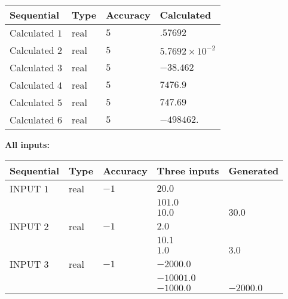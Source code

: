 \documentclass[12pt]{article}
\begin{document}
  
\noindent\begin{tabular}{|l|l|l|l|}
\hline
 Sequential & Type & Accuracy & Calculated \\ 
\hline
 
 
  Calculated $           1$ & real & $           5 $ & 
 $ .57692 $ 
 \\  \hline  
 
 
  Calculated $           2$ & real & $           5 $ & 
 $ 5.7692 \times 10^{-2} $ 
 \\  \hline  
 
 
  Calculated $           3$ & real & $           5 $ & 
 $ -38.462 $ 
 \\  \hline  
 
 
  Calculated $           4$ & real & $           5 $ & 
 $ 7476.9 $ 
 \\  \hline  
 
 
  Calculated $           5$ & real & $           5 $ & 
 $ 747.69 $ 
 \\  \hline  
 
 
  Calculated $           6$ & real & $           5 $ & 
 $ -498462. $ 
 \\  \hline  
 \end{tabular}
   
   
   
   
\noindent\vspace{0.1in}\hspace{-0.08in} {\textbf{\Large{All inputs: }}}
   
   
  
  
\noindent\begin{tabular}{|l|l|l|l|l|}
\hline
 Sequential & Type & Accuracy & Three inputs & Generated \\ 
\hline
 
 
  INPUT $           1$ & real & $          -1 $ & $
 20.0
  $ & \\
  & & &  $
 101.0
  $ & \\
  & & &  $
 10.0
 $ & $ 30.0 $ 
 \\  \hline  
 
 
  INPUT $           2$ & real & $          -1 $ & $
 2.0
  $ & \\
  & & &  $
 10.1
  $ & \\
  & & &  $
 1.0
 $ & $ 3.0 $ 
 \\  \hline  
 
 
  INPUT $           3$ & real & $          -1 $ & $
 -2000.0
  $ & \\
  & & &  $
 -10001.0
  $ & \\
  & & &  $
 -1000.0
 $ & $ -2000.0 $ 
 \\  \hline  
 \end{tabular}
   
\end{document}
